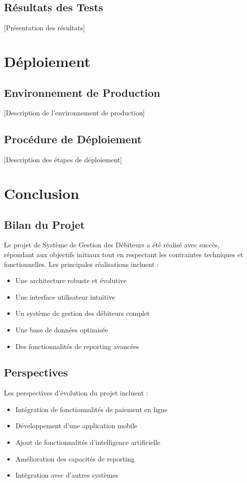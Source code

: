\documentclass[12pt,a4paper]{report}
\begin{document}
\section{Résultats des Tests}
[Présentation des résultats]

\chapter{Déploiement}
\section{Environnement de Production}
[Description de l'environnement de production]

\section{Procédure de Déploiement}
[Description des étapes de déploiement]

\chapter{Conclusion}
\section{Bilan du Projet}
Le projet de Système de Gestion des Débiteurs a été réalisé avec succès, répondant aux objectifs initiaux tout en respectant les contraintes techniques et fonctionnelles. Les principales réalisations incluent :

\begin{itemize}
    \item Une architecture robuste et évolutive
    \item Une interface utilisateur intuitive
    \item Un système de gestion des débiteurs complet
    \item Une base de données optimisée
    \item Des fonctionnalités de reporting avancées
\end{itemize}

\section{Perspectives}
Les perspectives d'évolution du projet incluent :

\begin{itemize}
    \item Intégration de fonctionnalités de paiement en ligne
    \item Développement d'une application mobile
    \item Ajout de fonctionnalités d'intelligence artificielle
    \item Amélioration des capacités de reporting
    \item Intégration avec d'autres systèmes
\end{itemize}
\end{document}
